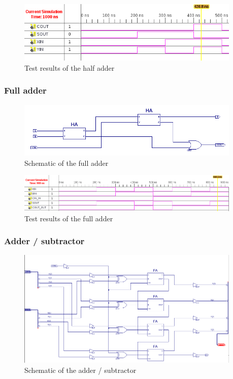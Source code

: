 \documentclass[11pt]{article}
\begin{document}
\begin{figure}[htpb]
	\centering
	\includegraphics[width=0.95\textwidth]{HA_test}
	\caption{Test results of the half adder}
	\label{fig:HA_test}
\end{figure}

\subsubsection{Full adder}
\begin{figure}[htpb]
	\centering
	\includegraphics[width=0.95\textwidth]{FA-schematic}
	\caption{Schematic of the full adder}
	\label{fig:FA_schematic}
\end{figure}

\begin{figure}[htpb]
	\centering
	\includegraphics[width=0.95\textwidth]{FA_test}
	\caption{Test results of the full adder}
	\label{fig:FA_test}
\end{figure}

\subsubsection{Adder / subtractor}
\begin{figure}[htpb]
	\centering
	\includegraphics[width=0.95\textwidth]{add_sub-schematic}
	\caption{Schematic of the adder / subtractor}
	\label{fig:AS_schematic}
\end{figure}
\end{document}
